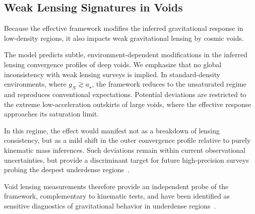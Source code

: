 \subsection{Weak Lensing Signatures in Voids}
  \label{subsec:void_lensing}

  Because the effective framework modifies the inferred gravitational response
  in low-density regions, it also impacts weak gravitational lensing by cosmic
  voids.

  The model predicts subtle, environment-dependent modifications in the
  inferred lensing convergence profiles of deep voids.
  We emphasize that no global inconsistency with weak lensing surveys
  is implied.
  In standard-density environments, where $g_N \gtrsim a_\star$,
  the framework reduces to the unsaturated regime and reproduces
  conventional expectations.
  Potential deviations are restricted to the extreme low-acceleration
  outskirts of large voids, where the effective response approaches
  its saturation limit.

  In this regime, the effect would manifest not as a breakdown of
  lensing consistency, but as a mild shift in the outer convergence
  profile relative to purely kinematic mass inferences.
  Such deviations remain within current observational uncertainties,
  but provide a discriminant target for future high-precision
  surveys probing the deepest underdense regions~\cite{Cai2017VoidLensing}.

  Void lensing measurements therefore provide an independent probe of the
  framework, complementary to kinematic tests, and have been identified as
  sensitive diagnostics of gravitational behavior in underdense
  regions~\cite{Cai2017VoidLensing}.
